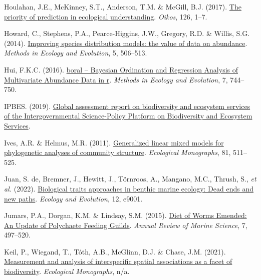 \documentclass[9pt,biorxiv,doublespacing,lineno,endfloat]{lapreprint}
\newlength{\cslhangindent}
\newlength{\cslentryspacingunit} %
\newenvironment{CSLReferences}[2] %
 {%
  \setlength{\parindent}{0pt}
  \ifodd #1
  \let\oldpar\par
  \def\par{\hangindent=\cslhangindent\oldpar}
  \fi
  \setlength{\parskip}{#2\cslentryspacingunit}
 }%
 {}
\begin{document}
\begin{CSLReferences}{1}{0}
\leavevmode{}%
Houlahan, J.E., McKinney, S.T., Anderson, T.M. \& McGill, B.J. (2017).
\href{https://doi.org/10.1111/oik.03726}{The priority of prediction in
ecological understanding}. \emph{Oikos}, 126, 1--7.

\leavevmode{}%
Howard, C., Stephens, P.A., Pearce-Higgins, J.W., Gregory, R.D. \&
Willis, S.G. (2014).
\href{https://doi.org/10.1111/2041-210X.12184}{Improving species
distribution models: the value of data on abundance}. \emph{Methods in
Ecology and Evolution}, 5, 506--513.

\leavevmode{}%
Hui, F.K.C. (2016). \href{https://doi.org/10.1111/2041-210X.12514}{boral
-- Bayesian Ordination and Regression Analysis of Multivariate Abundance
Data in r}. \emph{Methods in Ecology and Evolution}, 7, 744--750.

\leavevmode{}%
IPBES. (2019). \href{https://doi.org/10.5281/zenodo.6417333}{Global
assessment report on biodiversity and ecosystem services of the
Intergovernmental Science-Policy Platform on Biodiversity and Ecosystem
Services}.

\leavevmode{}%
Ives, A.R. \& Helmus, M.R. (2011).
\href{https://doi.org/10.1890/10-1264.1}{Generalized linear mixed models
for phylogenetic analyses of community structure}. \emph{Ecological
Monographs}, 81, 511--525.

\leavevmode{}%
Juan, S. de, Bremner, J., Hewitt, J., Törnroos, A., Mangano, M.C.,
Thrush, S., \emph{et al.} (2022).
\href{https://doi.org/10.1002/ece3.9001}{Biological traits approaches in
benthic marine ecology: Dead ends and new paths}. \emph{Ecology and
Evolution}, 12, e9001.

\leavevmode{}%
Jumars, P.A., Dorgan, K.M. \& Lindsay, S.M. (2015).
\href{https://doi.org/10.1146/annurev-marine-010814-020007}{Diet of
Worms Emended: An Update of Polychaete Feeding Guilds}. \emph{Annual
Review of Marine Science}, 7, 497--520.

\leavevmode{}%
Keil, P., Wiegand, T., Tóth, A.B., McGlinn, D.J. \& Chase, J.M. (2021).
\href{https://doi.org/10.1002/ecm.1452}{Measurement and analysis of
interspecific spatial associations as a facet of biodiversity}.
\emph{Ecological Monographs}, n/a.


\end{CSLReferences}
\end{document}
